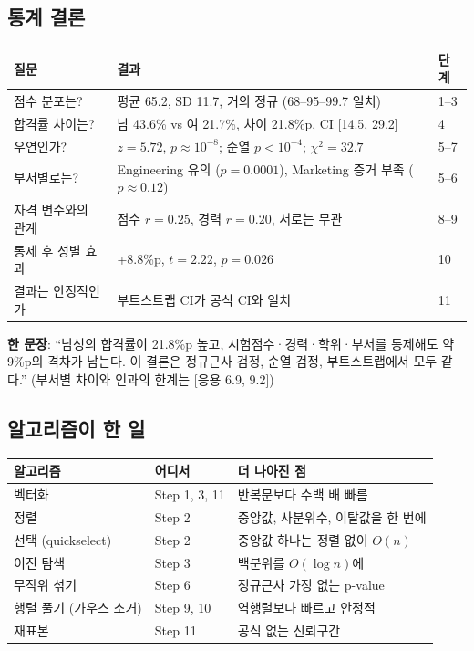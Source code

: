 \documentclass[11pt,a4paper]{article}
\newcommand{\Hc}[1]{{\scriptsize\textsf{\color{orange!70!black}[응용 #1]}}}
\begin{document}
\subsection{통계 결론}
\begin{center}\small
\begin{tabular}{@{}l l l@{}}
\toprule
질문 & 결과 & 단계 \\
\midrule
점수 분포는? & 평균 65.2, SD 11.7, 거의 정규 (68–95–99.7 일치) & 1–3 \\
합격률 차이는? & 남 43.6\% vs 여 21.7\%, 차이 21.8\%p, CI [14.5, 29.2] & 4 \\
우연인가? & $z=5.72$, $p\approx10^{-8}$; 순열 $p<10^{-4}$; $\chi^2=32.7$ & 5–7 \\
부서별로는? & Engineering 유의 ($p=0.0001$), Marketing 증거 부족 ($p\approx0.12$) & 5–6 \\
자격 변수와의 관계 & 점수 $r=0.25$, 경력 $r=0.20$, 서로는 무관 & 8–9 \\
통제 후 성별 효과 & +8.8\%p, $t=2.22$, $p=0.026$ & 10 \\
결과는 안정적인가 & 부트스트랩 CI가 공식 CI와 일치 & 11 \\
\bottomrule
\end{tabular}
\end{center}
\textbf{한 문장}: ``남성의 합격률이 21.8\%p 높고, 시험점수·경력·학위·부서를 통제해도 약 9\%p의 격차가 남는다. 이 결론은 정규근사 검정, 순열 검정, 부트스트랩에서 모두 같다.'' (부서별 차이와 인과의 한계는 \Hc{6.9, 9.2})

\subsection{알고리즘이 한 일}
\begin{center}\small
\begin{tabular}{@{}l l l@{}}
\toprule
알고리즘 & 어디서 & 더 나아진 점 \\
\midrule
벡터화 & Step 1, 3, 11 & 반복문보다 수백 배 빠름 \\
정렬 & Step 2 & 중앙값, 사분위수, 이탈값을 한 번에 \\
선택 (quickselect) & Step 2 & 중앙값 하나는 정렬 없이 $O(n)$ \\
이진 탐색 & Step 3 & 백분위를 $O(\log n)$에 \\
무작위 섞기 & Step 6 & 정규근사 가정 없는 p-value \\
행렬 풀기 (가우스 소거) & Step 9, 10 & 역행렬보다 빠르고 안정적 \\
재표본 & Step 11 & 공식 없는 신뢰구간 \\
\bottomrule
\end{tabular}
\end{center}
\end{document}

